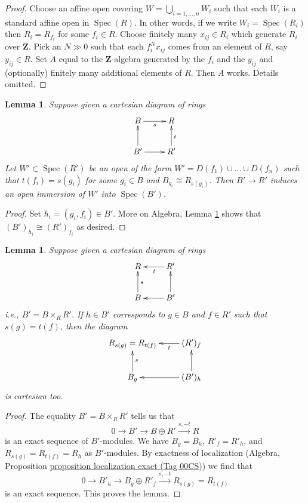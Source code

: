 \documentclass{amsart}
\theoremstyle{plain}
\newtheorem{lemma}[subsection]{Lemma}
\theoremstyle{definition}
\theoremstyle{remark}
\numberwithin{equation}{subsection}
\def\Spec{\mathop{\mathrm{Spec}}}
\begin{document}
\begin{proof}
Choose an affine open covering $W = \bigcup_{i = 1, \ldots, n} W_i$
such that each $W_i$ is a standard affine open in $\Spec(R)$.
In other words, if we write $W_i = \Spec(R_i)$
then $R_i = R_{f_i}$ for some $f_i \in R$.
Choose finitely many $x_{ij} \in R_i$ which generate
$R_i$ over $\mathbf{Z}$.
Pick an $N \gg 0$ such that each $f_i^Nx_{ij}$ comes from an
element of $R$, say $y_{ij} \in R$.
Set $A$ equal to the $\mathbf{Z}$-algebra generated by
the $f_i$ and the $y_{ij}$ and (optionally) finitely many
additional elements of $R$. Then $A$ works. Details omitted.
\end{proof}


\begin{lemma}
\label{lemma-diagram}
Suppose given a cartesian diagram of rings
$$
\xymatrix{
B \ar[r]_s & R \\
B'\ar[u] \ar[r] & R' \ar[u]_t
}
$$
Let $W' \subset \Spec(R')$ be an open of
the form $W' = D(f_1) \cup \ldots \cup D(f_n)$
such that $t(f_i) = s(g_i)$ for some $g_i \in B$
and $B_{g_i} \cong R_{s(g_i)}$. Then $B' \to R'$
induces an open immersion of $W'$ into $\Spec(B')$.
\end{lemma}

\begin{proof}
Set $h_i = (g_i, f_i) \in B'$. More on Algebra,
Lemma \ref{more-algebra-lemma-diagram-localize} shows that
$(B')_{h_i} \cong (R')_{f_i}$ as desired.
\end{proof}


\begin{lemma}
\label{more-algebra-lemma-diagram-localize}
Suppose given a cartesian diagram of rings
$$
\xymatrix{
R &
R' \ar[l]^t \\
B \ar[u]_s &
B'\ar[u] \ar[l]
}
$$
i.e., $B' = B \times_R R'$. If $h \in B'$ corresponds to $g \in B$
and $f \in R'$ such that $s(g) = t(f)$, then the diagram
$$
\xymatrix{
R_{s(g)} = R_{t(f)} &
(R')_f \ar[l]^-t \\
B_g \ar[u]_s &
(B')_h \ar[u] \ar[l]
}
$$
is cartesian too.
\end{lemma}

\begin{proof}
The equality $B' = B \times_R R'$ tells us that
$$
0 \to B' \to B \oplus R' \xrightarrow{s, -t} R
$$
is an exact sequence of $B'$-modules. We have $B_g = B_h$,
$R'_f = R'_h$, and $R_{s(g)} = R_{t(f)} = R_h$ as $B'$-modules.
By exactness of localization
(Algebra, Proposition \href{https://stacks.math.columbia.edu/tag/00CS}{proposition localization exact (Tag 00CS)})
we find that
$$
0 \to B'_h \to B_g \oplus R'_f \xrightarrow{s, -t} R_{s(g)} = R_{t(f)}
$$
is an exact sequence. This proves the lemma.
\end{proof}
\end{document}
